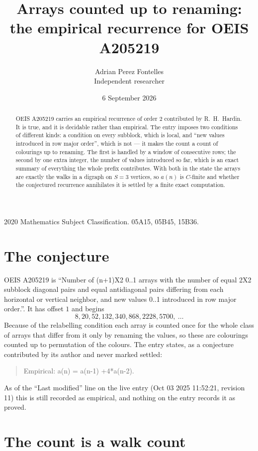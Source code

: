 \documentclass[11pt,a4paper]{article}
\title{Arrays counted up to renaming: the empirical recurrence for OEIS A205219}
\author{Adrian Perez Fontelles\\ \small Independent researcher}
\date{6 September 2026}
\theoremstyle{plain}
\theoremstyle{definition}
\begin{document}
\maketitle

\begin{abstract}
OEIS A205219 carries an empirical recurrence of order $2$ contributed by R.~H.~Hardin. It is
true, and it is decidable rather than empirical. The entry imposes two conditions of different
kinds: a condition on every subblock, which is local, and ``new values introduced in row major
order'', which is not --- it makes the count a count of colourings up to renaming. The first is
handled by a window of consecutive rows; the second by one extra integer, the number of values
introduced so far, which is an exact summary of everything the whole prefix contributes. With
both in the state the arrays are exactly the walks in a digraph on $S=3$ vertices, so $a(n)$
is $C$-finite and whether the conjectured recurrence annihilates it is settled by a finite
exact computation.
\end{abstract}

\noindent\small 2020 Mathematics Subject Classification. 05A15, 05B45, 15B36.\normalsize

\section{The conjecture}

OEIS A205219 is ``Number of (n+1)X2 0..1 arrays with the number of equal 2X2 subblock diagonal pairs and equal antidiagonal pairs differing from each horizontal or vertical neighbor, and new values 0..1 introduced in row major order.''. It has offset $1$ and begins
\[
8, 20, 52, 132, 340, 868, 2228, 5700,\ \dots
\]
Because of the relabelling condition each array is counted once for the whole class of arrays that differ from it only by renaming the values, so these are colourings counted up to permutation of the colours.
The entry states, as a conjecture contributed by its author and never marked settled:
\begin{quote}
Empirical: a(n) = a(n-1) +4*a(n-2).
\end{quote}
As of the ``Last modified'' line on the live entry (Oct 03 2025 11:52:21, revision 11) this is still
recorded as empirical, and nothing on the entry records it as proved.

\section{The count is a walk count}
\end{document}
